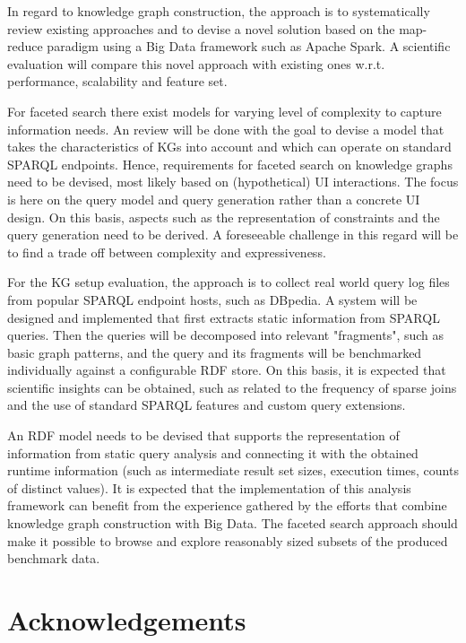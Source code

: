 In regard to knowledge graph construction, the approach is to systematically review existing approaches and to devise a novel solution based on the map-reduce paradigm using a Big Data framework such as Apache Spark. A scientific evaluation will compare this novel approach with existing ones w.r.t. performance, scalability and feature set.

For faceted search there exist models for varying level of complexity to capture information needs. An review will be done with the goal to devise a model that takes the characteristics of KGs into account and which can operate on standard SPARQL endpoints. Hence, requirements for faceted search on knowledge graphs need to be devised, most likely based on (hypothetical) UI interactions. The focus is here on the query model and query generation rather than a concrete UI design. On this basis, aspects such as the representation of constraints and the query generation need to be derived. A foreseeable challenge in this regard will be to find a trade off between complexity and expressiveness.

For the KG setup evaluation, the approach is to collect real world query log files from popular SPARQL endpoint hosts, such as DBpedia. A system will be designed and implemented that first extracts static information from SPARQL queries. Then the queries will be decomposed into relevant "fragments", such as basic graph patterns, and the query and its fragments will be benchmarked individually against a configurable RDF store. On this basis, it is expected that scientific insights can be obtained, such as related to the frequency of sparse joins and the use of standard SPARQL features and custom query extensions.

An RDF model needs to be devised that supports the representation of information from static query analysis and connecting it with the obtained runtime information (such as intermediate result set sizes, execution times, counts of distinct values). It is expected that the implementation of this analysis framework can benefit from the experience gathered by the efforts that combine knowledge graph construction with Big Data. The faceted search approach should make it possible to browse and explore reasonably sized subsets of the produced benchmark data.


\chapter*{Acknowledgements}



